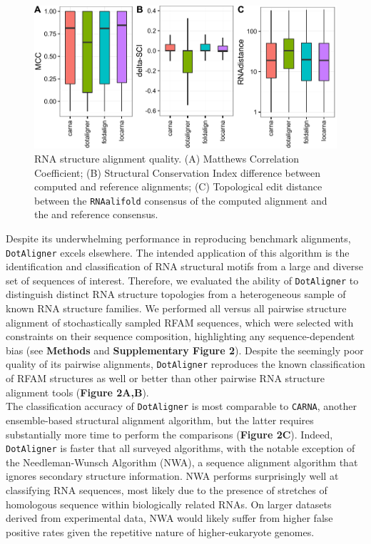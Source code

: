 \documentclass[a4paper,11pt]{article}
\newcommand\dotaligner{\texttt{DotAligner}}
\newcommand\carna{\texttt{CARNA}}
\newcommand\rnaalifold{\texttt{RNAalifold}}
\begin{document}
\begin{figure}
 \includegraphics[width=\textwidth]{fig1}
 \caption {RNA structure alignment quality. (A) Matthews Correlation Coefficient; 
 (B) Structural Conservation Index difference between computed and reference alignments; 
 (C) Topological  edit distance between the \rnaalifold{} consensus of the computed alignment 
 and the and reference consensus.  }
\end{figure}

Despite its underwhelming performance in reproducing benchmark alignments, \dotaligner{} 
excels elsewhere. The intended application of this algorithm is the identification and
classification of RNA structural motifs from a large and diverse set of sequences of interest. 
Therefore, we evaluated the ability of \dotaligner{} to distinguish distinct RNA structure
 topologies from a heterogeneous sample of known 
 RNA structure families. We performed all versus all 
pairwise structure alignment of stochastically sampled RFAM sequences, which 
were selected with constraints on their sequence composition,  highlighting any 
sequence-dependent bias (see \textbf{Methods} and \textbf{Supplementary Figure 2}). Despite the seemingly
poor quality of its pairwise alignments, \dotaligner{} reproduces the known classification 
of RFAM structures as well or better than other pairwise RNA structure alignment tools
(\textbf{Figure 2A,B}). \\

The classification accuracy  of \dotaligner{} is most comparable 
to \carna{}, another ensemble-based structural alignment algorithm, but the latter
requires substantially more time to perform the comparisons (\textbf{Figure 2C}). 
Indeed, \dotaligner{} is faster that all surveyed algorithms, with the notable 
exception of the Needleman-Wunsch Algorithm (NWA), a sequence alignment 
algorithm that ignores secondary structure information. NWA performs 
surprisingly well at classifying RNA sequences, most likely due to the presence
of stretches of homologous sequence within biologically related RNAs. On 
larger datasets derived from experimental data, NWA would likely suffer from 
higher false positive rates given the repetitive nature of higher-eukaryote genomes.
\end{document}
